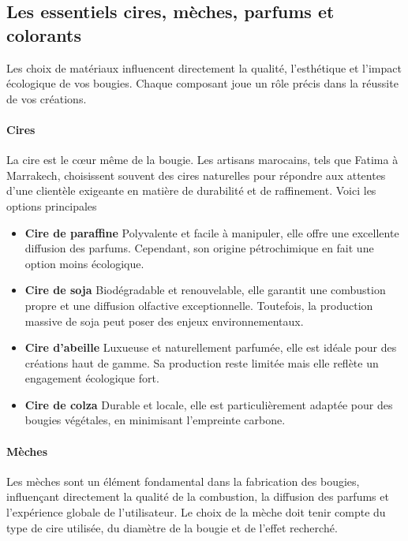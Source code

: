 \documentclass[11pt,fleqn,onecolumn,oneside]{book}
\begin{document}
\subsection*{Les essentiels cires, mèches, parfums et colorants}

\begin{remark}
Les choix de matériaux influencent directement la qualité, l’esthétique et l’impact écologique de vos bougies. Chaque composant joue un rôle précis dans la réussite de vos créations.
\end{remark}

\paragraph{Cires} 
La cire est le cœur même de la bougie. Les artisans marocains, tels que Fatima à Marrakech, choisissent souvent des cires naturelles pour répondre aux attentes d’une clientèle exigeante en matière de durabilité et de raffinement. Voici les options principales
\begin{itemize}
    \item \textbf{Cire de paraffine} Polyvalente et facile à manipuler, elle offre une excellente diffusion des parfums. Cependant, son origine pétrochimique en fait une option moins écologique.
    \item \textbf{Cire de soja} Biodégradable et renouvelable, elle garantit une combustion propre et une diffusion olfactive exceptionnelle. Toutefois, la production massive de soja peut poser des enjeux environnementaux.
    \item \textbf{Cire d’abeille} Luxueuse et naturellement parfumée, elle est idéale pour des créations haut de gamme. Sa production reste limitée mais elle reflète un engagement écologique fort.
    \item \textbf{Cire de colza} Durable et locale, elle est particulièrement adaptée pour des bougies végétales, en minimisant l’empreinte carbone.
\end{itemize}

\paragraph{Mèches} 
Les mèches sont un élément fondamental dans la fabrication des bougies, influençant directement la qualité de la combustion, la diffusion des parfums et l’expérience globale de l’utilisateur. Le choix de la mèche doit tenir compte du type de cire utilisée, du diamètre de la bougie et de l’effet recherché.
\end{document}
